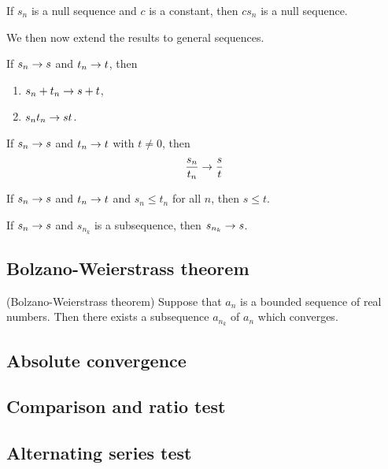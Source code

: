 \documentclass[main.tex]{subfiles}
\begin{document}
	\begin{corollary}
		If $s_n$ is a null sequence and $c$ is a constant, then $cs_n$ is a null sequence.
	\end{corollary}
	We then now extend the results to general sequences.
	\begin{theorem}
		If $s_n \rightarrow s$ and $t_n \rightarrow t$, then
		\begin{enumerate}
			\item $s_n + t_n \rightarrow s + t$,
			\item $s_n t_n \rightarrow st$.
		\end{enumerate}
	\end{theorem}
	
	\begin{theorem}
		If $s_n \rightarrow s$ and $t_n \rightarrow t$ with $t \neq 0$, then
		\begin{equation*}
		\frac{s_n}{t_n} \rightarrow \frac{s}{t}
		\end{equation*}
	\end{theorem}
	
	\begin{theorem}
		If $s_n \rightarrow s$ and $t_n \rightarrow t$ and $s_n \leq t_n$ for all $n$, then $s \leq t$.
	\end{theorem}
	
	\begin{theorem}
		If $s_n \rightarrow s$ and $s_{n_k}$ is a subsequence, then $s_{n_k} \rightarrow s$.
	\end{theorem}
	
	\subsection{Bolzano-Weierstrass theorem}
	\begin{theorem}(Bolzano-Weierstrass theorem)
		Suppose that $a_n$ is a bounded sequence of real numbers. Then there exists a subsequence $a_{n_k}$ of $a_n$ which converges.
	\end{theorem}

	\subsection{Absolute convergence}
	
	\subsection{Comparison and ratio test}
	
	\subsection{Alternating series test}
	
\end{document}
